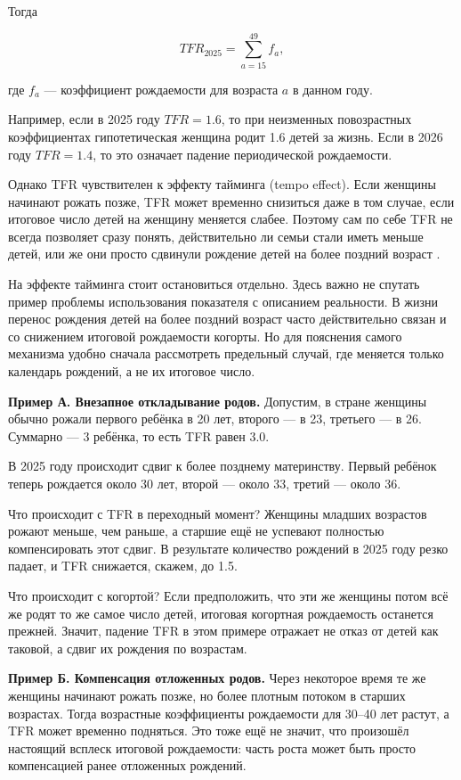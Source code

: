 \documentclass[a4paper, 14pt]{extarticle}
\begin{document}
Тогда

\[
TFR_{2025} = \sum_{a=15}^{49} f_a,
\]

где $f_a$ --- коэффициент рождаемости для возраста $a$ в данном году.

Например, если в 2025 году $TFR = 1.6$, то при неизменных повозрастных коэффициентах гипотетическая женщина родит 1.6 детей за жизнь. Если в 2026 году $TFR = 1.4$, то это означает падение периодической рождаемости.

Однако TFR чувствителен к эффекту тайминга (tempo effect). Если женщины начинают рожать позже, TFR может временно снизиться даже в том случае, если итоговое число детей на женщину меняется слабее. Поэтому сам по себе TFR не всегда позволяет сразу понять, действительно ли семьи стали иметь меньше детей, или же они просто сдвинули рождение детей на более поздний возраст \cite{owid_tfr_tempo,owid_cohort_period}.

На эффекте тайминга стоит остановиться отдельно. Здесь важно не спутать пример проблемы использования показателя с описанием реальности. В жизни перенос рождения детей на более поздний возраст часто действительно связан и со снижением итоговой рождаемости когорты. Но для пояснения самого механизма удобно сначала рассмотреть предельный случай, где меняется только календарь рождений, а не их итоговое число.

\textbf{Пример А. Внезапное откладывание родов.}
Допустим, в стране женщины обычно рожали первого ребёнка в 20 лет, второго --- в 23, третьего --- в 26. Суммарно --- 3 ребёнка, то есть TFR равен 3.0.

В 2025 году происходит сдвиг к более позднему материнству. Первый ребёнок теперь рождается около 30 лет, второй --- около 33, третий --- около 36.

Что происходит с TFR в переходный момент? Женщины младших возрастов рожают меньше, чем раньше, а старшие ещё не успевают полностью компенсировать этот сдвиг. В результате количество рождений в 2025 году резко падает, и TFR снижается, скажем, до 1.5.

Что происходит с когортой? Если предположить, что эти же женщины потом всё же родят то же самое число детей, итоговая когортная рождаемость останется прежней. Значит, падение TFR в этом примере отражает не отказ от детей как таковой, а сдвиг их рождения по возрастам.

\textbf{Пример Б. Компенсация отложенных родов.}
Через некоторое время те же женщины начинают рожать позже, но более плотным потоком в старших возрастах. Тогда возрастные коэффициенты рождаемости для 30--40 лет растут, а TFR может временно подняться. Это тоже ещё не значит, что произошёл настоящий всплеск итоговой рождаемости: часть роста может быть просто компенсацией ранее отложенных рождений.
\end{document}
